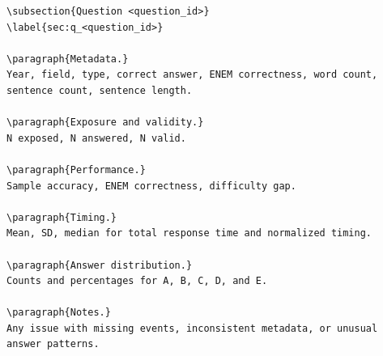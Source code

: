\begin{verbatim}
\subsection{Question <question_id>}
\label{sec:q_<question_id>}

\paragraph{Metadata.}
Year, field, type, correct answer, ENEM correctness, word count, sentence count, sentence length.

\paragraph{Exposure and validity.}
N exposed, N answered, N valid.

\paragraph{Performance.}
Sample accuracy, ENEM correctness, difficulty gap.

\paragraph{Timing.}
Mean, SD, median for total response time and normalized timing.

\paragraph{Answer distribution.}
Counts and percentages for A, B, C, D, and E.

\paragraph{Notes.}
Any issue with missing events, inconsistent metadata, or unusual answer patterns.
\end{verbatim}


